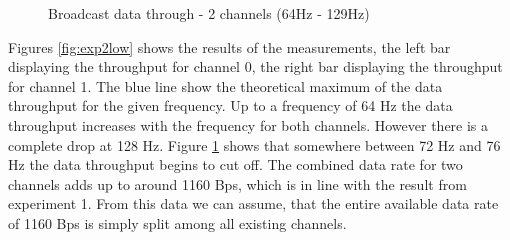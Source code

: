 \begin{description}
\begin{figure}[H]
		\caption{Broadcast data through - 2 channels (64Hz - 129Hz)}\label{fig:exp2high}
	\end{figure}
	Figures \ref{fig:exp2low} shows the results of the measurements, the left bar displaying the throughput for channel 0, the right bar displaying the throughput for channel 1. The blue line show the theoretical maximum of the data throughput for the given frequency. Up to a frequency of 64 Hz the data throughput increases with the frequency for both channels. However there is a complete drop at 128 Hz. Figure \ref{fig:exp2high} shows that somewhere between 72 Hz and 76 Hz the data throughput begins to cut off. The combined data rate for two channels adds up to around 1160 Bps, which is in line with the result from experiment 1. From this data we can assume, that the entire available data rate of 1160 Bps is simply split among all existing channels.
\end{description}
\newpage


